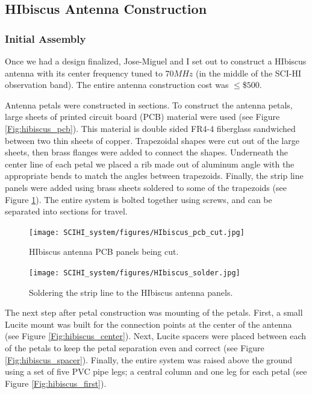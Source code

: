 \subsection{HIbiscus Antenna Construction}

\subsubsection{Initial Assembly}

Once we had a design finalized, Jose-Miguel and I set out to construct a HIbiscus antenna with its center frequency tuned to $70 MHz$ (in the middle of the SCI-HI observation band). The entire antenna construction cost was $\leq$\$$500$.

Antenna petals were constructed in sections. To construct the antenna petals, large sheets of printed circuit board (PCB) material were used (see Figure \ref{Fig:hibiscus_pcb}). This material is double sided FR4-4 fiberglass sandwiched between two thin sheets of copper. Trapezoidal shapes were cut out of the large sheets, then brass flanges were added to connect the shapes. Underneath the center line of each petal we placed a rib made out of aluminum angle with the appropriate bends to match the angles between trapezoids. Finally, the strip line panels were added using brass sheets soldered to some of the trapezoids (see Figure \ref{Fig:hibiscus_solder}). The entire system is bolted together using screws, and can be separated into sections for travel. 

\begin{figure}[htb]
\centering
\begin{minipage}[b]{0.39\textwidth}
\centering
\texttt{[image: SCIHI\_system/figures/HIbiscus\_pcb\_cut.jpg]}
\caption{HIbiscus antenna PCB panels being cut. }
\label{Fig:hibiscus_pcb}
\end{minipage}%
\begin{minipage}[b]{0.02\textwidth}
\hspace{1cm}
\end{minipage}%
\begin{minipage}[b]{0.56\textwidth}
\centering
\texttt{[image: SCIHI\_system/figures/HIbiscus\_solder.jpg]}
\caption{Soldering the strip line to the HIbiscus antenna panels.}
\label{Fig:hibiscus_solder}
\end{minipage}
\end{figure} 

The next step after petal construction was mounting of the petals. First, a small Lucite mount was built for the connection points at the center of the antenna (see Figure \ref{Fig:hibiscus_center}). Next, Lucite spacers were placed between each of the petals to keep the petal separation even and correct (see Figure \ref{Fig:hibiscus_spacer}). Finally, the entire system was raised above the ground using a set of five PVC pipe legs; a central column and one leg for each petal (see Figure \ref{Fig:hibiscus_first}). 

